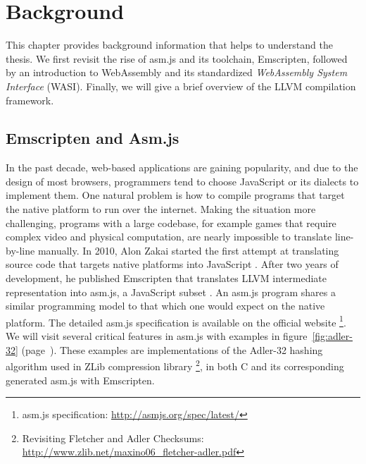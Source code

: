 \chapter{Background}

This chapter provides background information that helps to understand the
thesis. We first revisit the rise of asm.js and its toolchain, Emscripten,
followed by an introduction to WebAssembly and its standardized
\emph{WebAssembly System Interface} (WASI). Finally, we will give a brief
overview of the LLVM compilation framework.

\section{Emscripten and Asm.js}

In the past decade, web-based applications are gaining popularity, and due to
the design of most browsers, programmers tend to choose JavaScript or its
dialects to implement them. One natural problem is how to compile programs that
target the native platform to run over the internet. Making the situation more
challenging, programs with a large codebase, for example games that require
complex video and physical computation, are nearly impossible to translate
line-by-line manually. In 2010, Alon Zakai started the first attempt at
translating source code that targets native platforms into JavaScript
\cite{8118483}. After two years of development, he published Emscripten that
translates LLVM intermediate representation into asm.js, a JavaScript subset
\cite{10.1145/2048147.2048224}. An asm.js program shares a similar programming
model to that which one would expect on the native platform. The detailed asm.js
specification is available on the official website
\footnote{asm.js specification: \url{http://asmjs.org/spec/latest/}}.
We will visit several critical features in asm.js with examples in
figure~\ref{fig:adler-32} (page~\pageref{fig:adler-32}). These examples are
implementations of the Adler-32 hashing algorithm used in ZLib compression
library \cite{adler32-paper} \footnote{Revisiting Fletcher and Adler Checksums:
  \\\url{http://www.zlib.net/maxino06\_fletcher-adler.pdf}}, in both C and its
corresponding generated asm.js with Emscripten.

